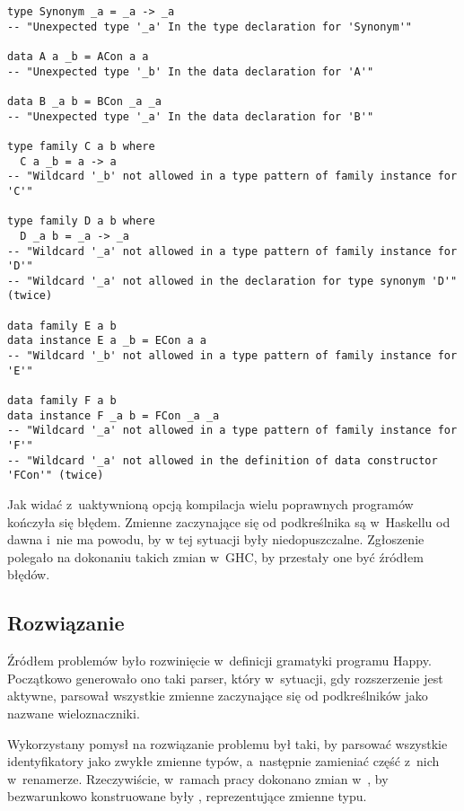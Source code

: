 \begin{lstlisting}[float,label={lst:namedwcs_not_allowed},
                   caption={Deklaracje, w których kompilacja kończyła się błędem, przy aktywnym rozszerzeniu \code{NamedWildCards}.}]
type Synonym _a = _a -> _a
-- "Unexpected type '_a' In the type declaration for 'Synonym'"

data A a _b = ACon a a
-- "Unexpected type '_b' In the data declaration for 'A'"

data B _a b = BCon _a _a
-- "Unexpected type '_a' In the data declaration for 'B'"

type family C a b where
  C a _b = a -> a
-- "Wildcard '_b' not allowed in a type pattern of family instance for 'C'"

type family D a b where
  D _a b = _a -> _a
-- "Wildcard '_a' not allowed in a type pattern of family instance for 'D'"
-- "Wildcard '_a' not allowed in the declaration for type synonym 'D'" (twice)

data family E a b
data instance E a _b = ECon a a
-- "Wildcard '_b' not allowed in a type pattern of family instance for 'E'"

data family F a b
data instance F _a b = FCon _a _a
-- "Wildcard '_a' not allowed in a type pattern of family instance for 'F'"
-- "Wildcard '_a' not allowed in the definition of data constructor 'FCon'" (twice)
\end{lstlisting}

Jak widać z~uaktywnioną opcją  kompilacja wielu poprawnych
programów kończyła się błędem. Zmienne zaczynające się od podkreślnika są
w~Haskellu od dawna i~nie ma powodu, by w tej sytuacji były niedopuszczalne.
Zgłoszenie polegało na dokonaniu takich zmian w~GHC, by przestały one być
źródłem błędów.

\subsection{Rozwiązanie} %

Źródłem problemów było rozwinięcie  w~definicji gramatyki programu
Happy. Początkowo generowało ono taki parser, który w~sytuacji, gdy rozszerzenie
 jest aktywne, parsował wszystkie zmienne zaczynające się od
podkreślników jako nazwane wieloznaczniki.

Wykorzystany pomysł na rozwiązanie problemu był taki, by parsować wszystkie
identyfikatory jako zwykłe zmienne typów, a~następnie zamieniać część z~nich
w~renamerze. Rzeczywiście, w~ramach pracy dokonano zmian w~, by
bezwarunkowo konstruowane były , reprezentujące zmienne typu.

